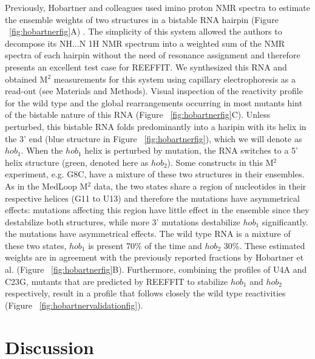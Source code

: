 \documentclass[12pt]{article}
\begin{document}
Previously, Hobartner and colleagues used imino proton NMR spectra to estimate the ensemble weights of two structures in a bistable RNA hairpin (Figure ~\ref{fig:hobartnerfig}A) \cite{Hobartner2003}. The simplicity of this system allowed the authors to decompose its NH...N 1H NMR spectrum into a weighted sum of the NMR spectra of each hairpin without the need of resonance assignment and therefore presents an excellent test case for REEFFIT. We synthesized this RNA and obtained M$^2$ measurements for this system using capillary electrophoresis as a read-out (see Materials and Methods). Visual inspection of the reactivity profile for the wild type and the global rearrangements occurring in most mutants hint of the bistable nature of this RNA (Figure ~\ref{fig:hobartnerfig}C). Unless perturbed, this bistable RNA folds predominantly into a haripin with its helix in the 3' end (blue structure in Figure ~\ref{fig:hobartnerfig}), which we will denote as $hob_1$. When the $hob_1$ helix is perturbed by mutation, the RNA switches to a 5' helix structure (green, denoted here as $hob_2$). Some constructs in this M$^2$ experiment, e.g. G8C, have a mixture of these two structures in their ensembles. As in the MedLoop M$^2$ data, the two states share a region of nucleotides in their respective helices (G11 to U13) and therefore the mutations have asymmetrical effects: mutations affecting this region have little effect in the ensemble since they destabilize both structures, while more 3' mutations destabilize $hob_1$ significantly. the mutations have asymmetrical effects. The wild type RNA is a mixture of these two states, $hob_1$ is present 70\% of the time and $hob_2$ 30\%. These estimated weights are in agreement with the previously reported fractions by Hobartner et al. (Figure ~\ref{fig:hobartnerfig}B). Furthermore, combining the profiles of U4A and C23G, mutants that are predicted by REEFFIT to stabilize $hob_1$ and $hob_2$ respectively, result in a profile that follows closely the wild type reactivities (Figure ~\ref{fig:hobartnervalidationfig}).

\section{Discussion}
\end{document}
